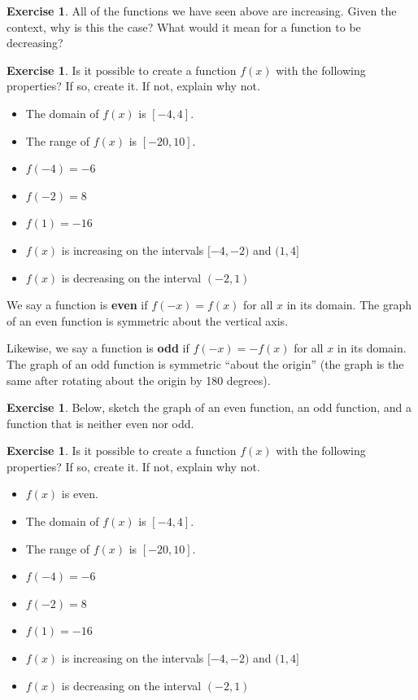 \documentclass[11pt,reqno,final]{amsart}
\numberwithin{equation}{section}
\numberwithin{figure}{section}
\theoremstyle{definition} %
\newtheorem{exercise}[question]{Exercise}
\begin{document}
\begin{exercise}
        All of the functions we have seen above are increasing.  Given the context, why is this the case?  What would it mean for a function to be decreasing?
        \vfill
\end{exercise}

\begin{exercise}
        Is it possible to create a function $f(x)$ with the following properties?  If so, create it.  If not, explain why not.
        \begin{itemize}
        \item The domain of $f(x)$ is $[-4,4]$.
        \item The range of $f(x)$ is $[-20,10]$.
        \item $f(-4)=-6$
        \item $f(-2)=8$
        \item $f(1)=-16$
        \item $f(x)$ is increasing on the intervals $[-4,-2)$ and $(1,4]$
        \item $f(x)$ is decreasing on the interval $(-2,1)$
        \end{itemize}
        \vfill
        \vfill
\end{exercise}

\newpage

\begin{framed}
        We say a function is \textbf{even} if $f(-x) = f(x)$ for all $x$ in its domain.
        The graph of an even function is symmetric about the vertical axis.  
        
        Likewise, we say a function is \textbf{odd} if $f(-x) = -f(x)$ for all $x$ in its domain.
        The graph of an odd function is symmetric ``about the origin''
        (the graph is the same after rotating about the origin by 180 degrees).
\end{framed}

\begin{exercise}
        Below, sketch the graph of an even function, an odd function, and a function that is neither even nor odd.
        \vfill
\end{exercise}

\begin{exercise}
        Is it possible to create a function $f(x)$ with the following properties?  If so, create it.  If not, explain why not.
        \begin{itemize}
        \item $f(x)$ is even.
        \item The domain of $f(x)$ is $[-4,4]$.
        \item The range of $f(x)$ is $[-20,10]$.
        \item $f(-4)=-6$
        \item $f(-2)=8$
        \item $f(1)=-16$
        \item $f(x)$ is increasing on the intervals $[-4,-2)$ and $(1,4]$
        \item $f(x)$ is decreasing on the interval $(-2,1)$
        \end{itemize}
        \vfill
\end{exercise}
\end{document}

